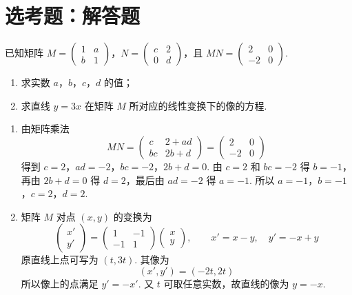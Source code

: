 \section{选考题：解答题}

\begin{problem}
已知矩阵 \(M = \begin{pmatrix}1 & a\\ b & 1 \end{pmatrix}\)，\(N = \begin{pmatrix}c & 2\\ 0 & d \end{pmatrix}\)，且 \(MN = \begin{pmatrix}2 & 0\\ -2 & 0 \end{pmatrix}\).
\begin{enumerate}
\item 求实数 \(a\)，\(b\)，\(c\)，\(d\) 的值；
\item 求直线 \(y = 3x\) 在矩阵 \(M\) 所对应的线性变换下的像的方程.
\end{enumerate}
\end{problem}

\begin{solution}
\begin{enumerate}
\item 由矩阵乘法
\[
MN=\begin{pmatrix}c&2+ad\\bc&2b+d\end{pmatrix}=\begin{pmatrix}2&0\\-2&0\end{pmatrix}
\]
得到
\(c=2\)，\(ad=-2\)，\(bc=-2\)，\(2b+d=0\).
由 \(c=2\) 和 \(bc=-2\) 得 \(b=-1\)，再由 \(2b+d=0\) 得 \(d=2\)，最后由 \(ad=-2\) 得 \(a=-1\). 所以
\(a=-1\)，\(b=-1\)，\(c=2\)，\(d=2\).

\item 矩阵 \(M\) 对点 \((x,y)\) 的变换为
\[
\begin{pmatrix}x'\\y'\end{pmatrix}
=\begin{pmatrix}1&-1\\-1&1\end{pmatrix}
\begin{pmatrix}x\\y\end{pmatrix},
\qquad x'=x-y,\quad y'=-x+y
\]
原直线上点可写为 \((t,3t)\). 其像为
\[
(x',y')=(-2t,2t)
\]
所以像上的点满足 \(y'=-x'\). 又 \(t\) 可取任意实数，故直线的像为 \(y=-x\).
\end{enumerate}
\end{solution}

